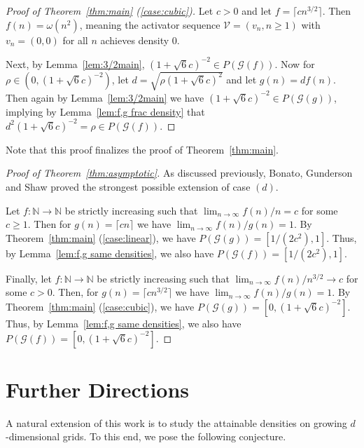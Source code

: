 \documentclass[12pt]{article}
\theoremstyle{remark}
\providecommand{\N}{}
\renewcommand{\N}{{\mathbb N}}
\newcommand\cG{\mathcal G}
\newcommand\cV{\mathcal V}
\begin{document}
\begin{proof}[Proof of Theorem~\ref{thm:main} (\ref{case:cubic})]
Let $c > 0$ and let $f = \lceil cn^{3/2} \rceil$. Then $f(n) = \omega(n^2)$, meaning the activator sequence $\cV = (v_n,n \geq 1)$ with $v_n = (0,0)$ for all $n$ achieves density $0$.  

Next, by Lemma~\ref{lem:3/2main}, $(1+\sqrt{6}c)^{-2} \in P(\cG(f))$. Now for $\rho \in (0,(1+\sqrt{6}c)^{-2})$, let $d = \sqrt{\rho (1+\sqrt{6}c)^{2}}$ and let $g(n) = df(n)$. Then again by Lemma~\ref{lem:3/2main} we have $(1+\sqrt{6}c)^{-2} \in P(\cG(g))$, implying by Lemma~\ref{lem:f,g frac density} that $d^2 (1+\sqrt{6}c)^{-2} = \rho \in P(\cG(f))$. 
\end{proof}

Note that this proof finalizes the proof of Theorem~\ref{thm:main}.

\begin{proof}[Proof of Theorem~\ref{thm:asymptotic}]
As discussed previously, Bonato, Gunderson and Shaw proved the strongest possible extension of case $(d)$. 

Let $f : \N \to \N$ be strictly increasing such that $\lim_{n \to \infty} f(n)/n = c$ for some $c \geq 1$. Then for $g(n) = \lceil cn \rceil$ we have $\lim_{n \to \infty} f(n)/g(n) = 1$. By Theorem~\ref{thm:main} (\ref{case:linear}), we have $P(\cG(g)) = [1/(2c^2),1]$. Thus, by Lemma~\ref{lem:f,g same densities}, we also have $P(\cG(f)) = [1/(2c^2),1]$. 

Finally, let $f : \N \to \N$ be strictly increasing such that $\lim_{n \to \infty} f(n)/n^{3/2} \to c$ for some $c > 0$. Then, for $g(n) = \lceil cn^{3/2} \rceil$ we have $\lim_{n \to \infty} f(n)/g(n) = 1$. By Theorem~\ref{thm:main} (\ref{case:cubic}), we have $P(\cG(g)) = [0,(1+\sqrt{6}c)^{-2}]$. Thus, by Lemma~\ref{lem:f,g same densities}, we also have $P(\cG(f)) = [0,(1+\sqrt{6}c)^{-2}]$. 
\end{proof}

\section{Further Directions}\label{sec:conclusion}

A natural extension of this work is to study the attainable densities on growing $d$-dimensional grids. To this end, we pose the following conjecture.
\end{document}
